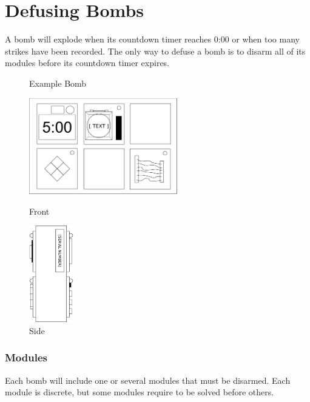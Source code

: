 \documentclass{../../ktane-mod}
\begin{document}
\section*{Defusing Bombs}
A bomb will explode when its countdown timer reaches 0:00 or when too many strikes have been recorded.
The only way to defuse a bomb is to disarm all of its modules before its countdown timer expires.

\begin{figure}[h]
  \centering
  \caption*{Example Bomb}
  \begin{minipage}{.4\textwidth}
    \centering
    \includegraphics[height=4.2cm]{images/bomb_front}
    \caption*{Front}
    \label{fig:sub1}
  \end{minipage}%
  \begin{minipage}{.3\textwidth}
    \centering
    \includegraphics[height=4.2cm]{images/bomb_side}
    \caption*{Side}
    \label{fig:sub2}
  \end{minipage}
\end{figure}

\subsubsection*{Modules}
Each bomb will include one or several modules that must be disarmed.
Each module is discrete, but some modules require to be solved before others.
\end{document}
